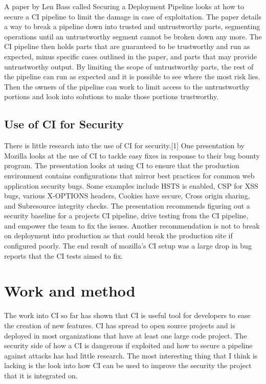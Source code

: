 	A paper by Len Bass called Securing a Deployment Pipeline looks at how to secure a CI pipeline to limit the damage in case of exploitation.\cite{Bass} The paper details a way to break a pipeline down into trusted and untrustworthy parts, segmenting operations until an untrustworthy segment cannot be broken down any more. The CI pipeline then holds parts that are guaranteed to be trustworthy and run as expected, minus specific cases outlined in the paper, and parts that may provide untrustworthy output. By limiting the scope of untrustworthy parts, the rest of the pipeline can run as expected and it is possible to see where the most risk lies. Then the owners of the pipeline can work to limit access to the untrustworthy portions and look into solutions to make those portions trustworthy.

\subsection{Use of CI for Security}
	There is little research into the use of CI for security.[1] One presentation by Mozilla looks at the use of CI to tackle easy fixes in response to their bug bounty program. The presentation looks at using CI to ensure that the production environment contains configurations that mirror best practices for common web application security bugs. Some examples include HSTS is enabled, CSP for XSS bugs, various X-OPTIONS headers, Cookies have secure, Cross origin sharing, and Subresource integrity
    checks. The presentation recommends figuring out a security baseline for a projects CI pipeline, drive testing from the CI pipeline, and empower the team to fix the issues. Another recommendation is not to break on deployment into production as that could break the production site if configured poorly. The end result of mozilla's CI setup was a large drop in bug reports that the CI tests aimed to fix.

\section{Work and method}
	The work into CI so far has shown that CI is useful tool for developers to ease the creation of new features. CI has spread to open source projects and is deployed in most organizations that have at least one large code project. The security side of how a CI is dangerous if exploited and how to secure a pipeline against attacks has had little research. The most interesting thing that I think is lacking is the look into how CI can be used to improve the security the project that it is integrated on.
	
